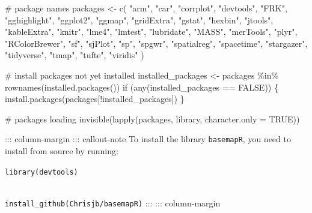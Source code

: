 \documentclass[
  letterpaper,
  DIV=11,
  numbers=noendperiod,
  oneside]{scrreprt}
\newenvironment{Shaded}{\begin{snugshade}}{\end{snugshade}}
\newcommand{\AttributeTok}[1]{\textcolor[rgb]{0.40,0.45,0.13}{#1}}
\newcommand{\CommentTok}[1]{\textcolor[rgb]{0.37,0.37,0.37}{#1}}
\newcommand{\ConstantTok}[1]{\textcolor[rgb]{0.56,0.35,0.01}{#1}}
\newcommand{\ControlFlowTok}[1]{\textcolor[rgb]{0.00,0.23,0.31}{#1}}
\newcommand{\FunctionTok}[1]{\textcolor[rgb]{0.28,0.35,0.67}{#1}}
\newcommand{\NormalTok}[1]{\textcolor[rgb]{0.00,0.23,0.31}{#1}}
\newcommand{\OtherTok}[1]{\textcolor[rgb]{0.00,0.23,0.31}{#1}}
\newcommand{\SpecialCharTok}[1]{\textcolor[rgb]{0.37,0.37,0.37}{#1}}
\newcommand{\StringTok}[1]{\textcolor[rgb]{0.13,0.47,0.30}{#1}}
\begin{document}
\begin{Shaded}
\begin{Highlighting}[]
\CommentTok{\# package names}
\NormalTok{packages }\OtherTok{\textless{}{-}} \FunctionTok{c}\NormalTok{(}
    \StringTok{"arm"}\NormalTok{,}
    \StringTok{"car"}\NormalTok{,}
    \StringTok{"corrplot"}\NormalTok{,}
    \StringTok{"devtools"}\NormalTok{,}
    \StringTok{"FRK"}\NormalTok{,}
    \StringTok{"gghighlight"}\NormalTok{,}
    \StringTok{"ggplot2"}\NormalTok{,}
    \StringTok{"ggmap"}\NormalTok{,}
    \StringTok{"gridExtra"}\NormalTok{,}
    \StringTok{"gstat"}\NormalTok{,}
    \StringTok{"hexbin"}\NormalTok{,}
    \StringTok{"jtools"}\NormalTok{,}
    \StringTok{"kableExtra"}\NormalTok{,}
    \StringTok{"knitr"}\NormalTok{,}
    \StringTok{"lme4"}\NormalTok{,}
    \StringTok{"lmtest"}\NormalTok{,}
    \StringTok{"lubridate"}\NormalTok{,}
    \StringTok{"MASS"}\NormalTok{,}
    \StringTok{"merTools"}\NormalTok{,}
    \StringTok{"plyr"}\NormalTok{,}
    \StringTok{"RColorBrewer"}\NormalTok{,}
    \StringTok{"sf"}\NormalTok{,}
    \StringTok{"sjPlot"}\NormalTok{,}
    \StringTok{"sp"}\NormalTok{,}
    \StringTok{"spgwr"}\NormalTok{,}
    \StringTok{"spatialreg"}\NormalTok{,}
    \StringTok{"spacetime"}\NormalTok{,}
    \StringTok{"stargazer"}\NormalTok{,}
    \StringTok{"tidyverse"}\NormalTok{,}
    \StringTok{"tmap"}\NormalTok{,}
    \StringTok{"tufte"}\NormalTok{,}
    \StringTok{"viridis"}
\NormalTok{)}

\CommentTok{\# install packages not yet installed}
\NormalTok{installed\_packages }\OtherTok{\textless{}{-}}\NormalTok{ packages }\SpecialCharTok{\%in\%} \FunctionTok{rownames}\NormalTok{(}\FunctionTok{installed.packages}\NormalTok{())}
\ControlFlowTok{if}\NormalTok{ (}\FunctionTok{any}\NormalTok{(installed\_packages }\SpecialCharTok{==} \ConstantTok{FALSE}\NormalTok{)) \{}
  \FunctionTok{install.packages}\NormalTok{(packages[}\SpecialCharTok{!}\NormalTok{installed\_packages])}
\NormalTok{\}}

\CommentTok{\# packages loading}
\FunctionTok{invisible}\NormalTok{(}\FunctionTok{lapply}\NormalTok{(packages, library, }\AttributeTok{character.only =} \ConstantTok{TRUE}\NormalTok{))}
\end{Highlighting}
\end{Shaded}

::: column-margin ::: callout-note To install the library
\texttt{basemapR}, you need to install from source by running:

\texttt{library(devtools)}\strut \\
\texttt{install\_github(\textquotesingle{}Chrisjb/basemapR\textquotesingle{})}
::: ::: column-margin
\end{document}
